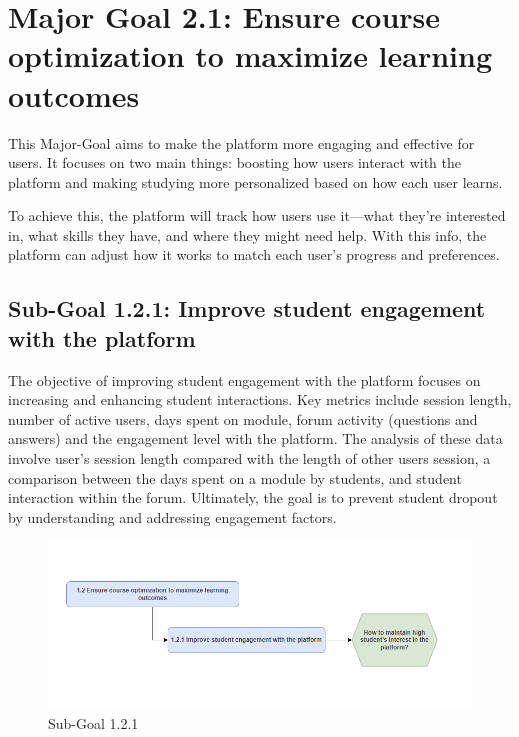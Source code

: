 \newpage
\section{Major Goal 2.1: Ensure course optimization to maximize learning outcomes}
This Major-Goal aims to make the platform more engaging and effective for users. It focuses on two main things: boosting how users interact with the platform and making studying more personalized based on how each user learns.

To achieve this, the platform will track how users use it—what they're interested in, what skills they have, and where they might need help. With this info, the platform can adjust how it works to match each user's progress and preferences. 

\subsection{Sub-Goal 1.2.1: Improve student engagement with the platform}
The objective of improving student engagement with the platform focuses on increasing and enhancing student interactions. Key metrics include session length, number of active users, days spent on module, forum activity (questions and answers) and the engagement level with the platform. The analysis of these data involve user's session length compared with the length of other users session, a comparison between the days spent on a module by students, and student interaction within the forum. Ultimately, the goal is to prevent student dropout by understanding and addressing engagement factors.

\begin{figure}[H]
    \centering
    \includegraphics[width=\textwidth]{./assets/subgoal_1.2.1.png}
    \caption{Sub-Goal 1.2.1}
    \label{fig:subgoal1.2.1}
\end{figure}

